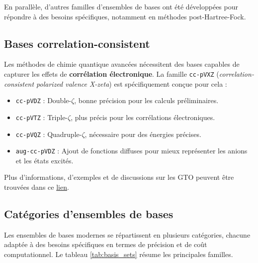 \documentclass[12pt,a4paper]{article} %
\numberwithin{equation}{section} %
\numberwithin{figure}{section} %
\numberwithin{table}{section} %
\begin{document}
En parallèle, d'autres familles d’ensembles de bases ont été développées pour répondre à des besoins spécifiques, notamment en méthodes post-Hartree-Fock.

\subsection{Bases correlation-consistent}

Les méthodes de chimie quantique avancées nécessitent des bases capables de capturer les effets de \textbf{corrélation électronique}. La famille \texttt{cc-pVXZ} (\textit{correlation-consistent polarized valence X-zeta}) est spécifiquement conçue pour cela :
\begin{itemize}
    \item \texttt{cc-pVDZ} : Double-$\zeta$, bonne précision pour les calculs préliminaires.
    \item \texttt{cc-pVTZ} : Triple-$\zeta$, plus précis pour les corrélations électroniques.
    \item \texttt{cc-pVQZ} : Quadruple-$\zeta$, nécessaire pour des énergies précises.
    \item \texttt{aug-cc-pVDZ} : Ajout de fonctions diffuses pour mieux représenter les anions et les états excités.
\end{itemize}

Plus d'informations, d'exemples et de discussions sur les GTO peuvent être trouvées dans ce  
\href{https://chem.libretexts.org/Courses/Pacific_Union_College/Quantum_Chemistry/11\%3A_Computational_Quantum_Chemistry/11.02\%3A_Gaussian_Basis_Sets}{lien}.

\subsection{Catégories d'ensembles de bases}

Les ensembles de bases modernes se répartissent en plusieurs catégories,
chacune adaptée à des besoins spécifiques en termes de précision et de coût
computationnel. Le tableau \ref{tab:basis_sets} résume les principales familles.
\end{document}
